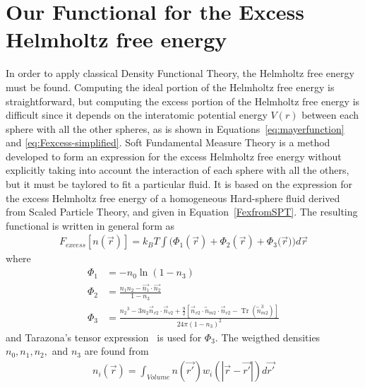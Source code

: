 \documentclass[double,12pt]{beavtex}
\begin{document}
\section{Our Functional for the Excess Helmholtz free energy}
In order to apply classical Density Functional Theory, the Helmholtz free 
energy must be found. Computing the ideal portion of the Helmholtz free 
energy is straightforward, but computing the excess portion of the 
Helmholtz free energy is difficult since it depends on the interatomic 
potential energy $V(r)$ between each sphere with all the other spheres, 
as is shown in Equations~\ref{eq:mayerfunction} and \ref{eq:Fexcess-simplified}.
Soft Fundamental Measure Theory is a method
developed to form an expression for the excess Helmholtz free energy without
explicitly taking into account the interaction of each sphere with all the others, 
but it must be taylored to fit a particular fluid\cite{schmidt1999density}. 
It is based on the expression for the excess Helmholtz 
free energy of a homogeneous Hard-sphere fluid derived 
from Scaled Particle Theory, and given in Equation~\ref{FexfromSPT}. 
The resulting functional 
is written in general form as 
\begin{align}\label{eq:Fexfunctional}
  F_{excess}[n(\vec{r})]=k_BT\int(\Phi_1(\vec{r})+\Phi_2(\vec{r})+\Phi_3(\vec{r}{)) d}\vec{r}
\end{align}
where
\begin{align}
\Phi_1 &= -n_{0}\ln(1-n_{3}) \\
\Phi_2 &= \frac{n_{1}n_{2}-\vec{n_{1}}\cdot\vec{n_{2}}}{1-n_{3}} \\
\Phi_3 &= \frac{{n_2}^3-3n_2\vec{n}_{v2}\cdot\vec{n}_{v2}+\frac{9}{2}[\vec{n}_{v2}\cdot{\overleftrightarrow{n}_{m2}}\cdot{\vec{n}_{v2}}-\operatorname{Tr}({\overleftrightarrow{n}^3_{m2}})]}{24\pi(1-n_3)^2}  
\end{align} 
and Tarazona's tensor expression~\cite{tarazonaphi3, santos2012phi3} is used 
for $\Phi_3$. The weigthed densities $n_0, n_1, n_2,$ and $n_3$ are found from
\begin{align}\label{eq:numdenprofile}
	n_i(\vec{r})=\int_{Volume}{n(\vec{r'})w_i(|\vec{r}-\vec{r'}|)d{\vec{r'}}}
\end{align}
\end{document}

